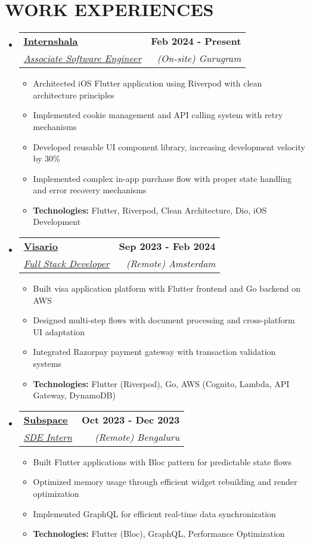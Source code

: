 \documentclass[letterpaper,10pt]{article}
\makeatletter
\newcommand{\resumeItem}[1]{
  \item\small{
    {#1 \vspace{-4pt}}
  }
}
\newcommand{\resumeSubheading}[4]{
  \vspace{-4pt}\item
    \begin{tabular*}{1.0\textwidth}[t]{l@{\extracolsep{\fill}}r}
      \textbf{\large#1} & \textbf{\small #2} \\
      \textit{\small#3} & \textit{\small #4} \\
    \end{tabular*}\vspace{-7pt}
}
\newcommand{\resumeSubHeadingListStart}{\begin{itemize}[leftmargin=0.0in, label={}]}
\newcommand{\resumeSubHeadingListEnd}{\end{itemize}}
\newcommand{\resumeItemListStart}{\begin{itemize}}
\newcommand{\resumeItemListEnd}{\end{itemize}\vspace{-6pt}}
\makeatother
\begin{document}
\section{WORK EXPERIENCES}

\resumeSubHeadingListStart

    \resumeSubheading
      {\href{https://internshala.com/}{\underline{Internshala}}}{Feb 2024 - Present} 
      {\underline{Associate Software Engineer}}{(On-site) Gurugram}
      \resumeItemListStart
        \resumeItem{\small{Architected iOS Flutter application using Riverpod with clean architecture principles}}
        \resumeItem{\small{Implemented cookie management and API calling system with retry mechanisms}}
        \resumeItem{\small{Developed reusable UI component library, increasing development velocity by 30\%}}
        \resumeItem{\small{Implemented complex in-app purchase flow with proper state handling and error recovery mechanisms}}
        \resumeItem{\small{\textbf{Technologies:} Flutter, Riverpod, Clean Architecture, Dio, iOS Development}}
      \resumeItemListEnd  
  \resumeSubHeadingListEnd
\vspace{-10pt}

   \resumeSubHeadingListStart

    \resumeSubheading
      {\href{https://www.myvisario.com/}{\underline{Visario}}}{Sep 2023 - Feb 2024} 
      {\underline{Full Stack Developer}}{(Remote) Amsterdam}
      \resumeItemListStart
        \resumeItem{\small{Built visa application platform with Flutter frontend and Go backend on AWS}}
        \resumeItem{\small{Designed multi-step flows with document processing and cross-platform UI adaptation}}
        \resumeItem{\small{Integrated Razorpay payment gateway with transaction validation systems}}
        \resumeItem{\small{\textbf{Technologies:} Flutter (Riverpod), Go, AWS (Cognito, Lambda, API Gateway, DynamoDB)}}
      \resumeItemListEnd  
  \resumeSubHeadingListEnd
\vspace{-10pt}

 \resumeSubHeadingListStart
    \resumeSubheading
      {\href{https://subspace.money/}{\underline{Subspace}}}{Oct 2023 - Dec 2023} 
      {\underline{SDE Intern}}{(Remote) Bengaluru}
      \resumeItemListStart
        \resumeItem{\small{Built Flutter applications with Bloc pattern for predictable state flows}}
        \resumeItem{\small{Optimized memory usage through efficient widget rebuilding and render optimization}}
        \resumeItem{\small{Implemented GraphQL for efficient real-time data synchronization}}
        \resumeItem{\small{\textbf{Technologies:} Flutter (Bloc), GraphQL, Performance Optimization}}
      \resumeItemListEnd  
  \resumeSubHeadingListEnd
\vspace{-10pt}
\end{document}
